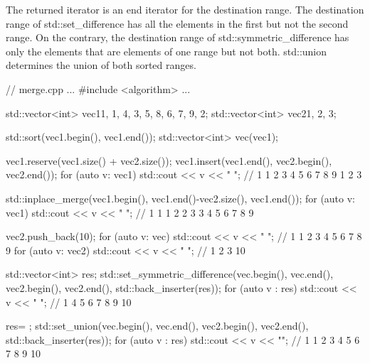 The returned iterator is an end iterator for the destination range. The destination range of std::set\_difference has all the elements in the first but not the second range. On the contrary, the destination range of std::symmetric\_difference has only the elements that are elements of one range but not both. std::union determines the union of both sorted ranges.


\begin{cpp}
// merge.cpp
...
#include <algorithm>
...

std::vector<int> vec1{1, 1, 4, 3, 5, 8, 6, 7, 9, 2};
std::vector<int> vec2{1, 2, 3};

std::sort(vec1.begin(), vec1.end());
std::vector<int> vec(vec1);

vec1.reserve(vec1.size() + vec2.size());
vec1.insert(vec1.end(), vec2.begin(), vec2.end());
for (auto v: vec1) std::cout << v << " "; // 1 1 2 3 4 5 6 7 8 9 1 2 3

std::inplace_merge(vec1.begin(), vec1.end()-vec2.size(), vec1.end());
for (auto v: vec1) std::cout << v << " "; // 1 1 1 2 2 3 3 4 5 6 7 8 9

vec2.push_back(10);
for (auto v: vec) std::cout << v << " "; // 1 1 2 3 4 5 6 7 8 9
for (auto v: vec2) std::cout << v << " "; // 1 2 3 10

std::vector<int> res;
std::set_symmetric_difference(vec.begin(), vec.end(), vec2.begin(), vec2.end(),
							  std::back_inserter(res));
for (auto v : res) std::cout << v << " "; // 1 4 5 6 7 8 9 10

res= {};
std::set_union(vec.begin(), vec.end(), vec2.begin(), vec2.end(),
std::back_inserter(res));
for (auto v : res) std::cout << v << ""; // 1 1 2 3 4 5 6 7 8 9 10
\end{cpp}





















